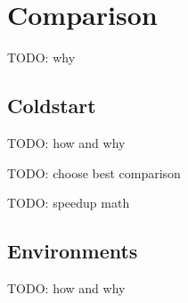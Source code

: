 \section{Comparison}\label{sec:comparison}


TODO: why

\subsection{Coldstart}

TODO: how and why

TODO: choose best comparison

TODO: speedup math





\subsection{Environments}

TODO: how and why


